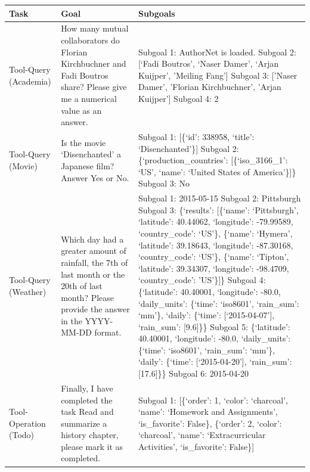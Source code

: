 \begin{table}[t!]
\centering
\footnotesize
\begin{tabular}{p{2.0cm}p{5.25cm}p{5.25cm}}
\toprule
\textbf{Task} & \textbf{Goal} & \textbf{Subgoals} \\ \midrule
Tool-Query (Academia)
&
How many mutual collaborators do Florian Kirchbuchner and Fadi Boutros share? Please give me a numerical value as an answer.
&
Subgoal 1: AuthorNet is loaded. \newline
Subgoal 2: [`Fadi Boutros', `Naser Damer', `Arjan Kuijper', 'Meiling Fang'] \newline
Subgoal 3: ['Naser Damer', 'Florian Kirchbuchner', 'Arjan Kuijper'] \newline
Subgoal 4: 2
\\
\midrule
Tool-Query (Movie)
&
Is the movie `Disenchanted' a Japanese film? Answer Yes or No.
&
Subgoal 1: [\{`id': 338958, `title': `Disenchanted'\}] \newline
Subgoal 2: \{`production\_countries': [\{`iso\_3166\_1': `US', `name': `United States of America'\}]\} \newline
Subgoal 3: No
\\
\midrule
Tool-Query (Weather)
&
Which day had a greater amount of rainfall, the 7th of last month or the 20th of last month? Please provide the answer in the YYYY-MM-DD format.
&
Subgoal 1: 2015-05-15 \newline
Subgoal 2: Pittsburgh \newline
Subgoal 3: \{`results': [\{`name': `Pittsburgh', `latitude': 40.44062, `longitude': -79.99589, `country\_code': `US'\}, \{`name': `Hymera', `latitude': 39.18643, `longitude': -87.30168, `country\_code': `US'\}, \{`name': `Tipton', `latitude': 39.34307, `longitude': -98.4709, `country\_code': 'US'\}]\} \newline
Subgoal 4: \{`latitude': 40.40001, `longitude': -80.0, `daily\_units': \{`time': `iso8601', `rain\_sum': `mm'\}, `daily': \{`time': [`2015-04-07'], `rain\_sum': [9.6]\}\} \newline
Subgoal 5: \{`latitude': 40.40001, `longitude': -80.0, `daily\_units': \{`time': `iso8601', `rain\_sum': `mm'\}, `daily': \{`time': [`2015-04-20'], `rain\_sum': [17.6]\}\} \newline
Subgoal 6: 2015-04-20
\\
\midrule
Tool-Operation (Todo)
&
Finally, I have completed the task Read and summarize a history chapter, please mark it as completed.
&
Subgoal 1: [\{`order': 1, `color': `charcoal', `name': `Homework and Assignments', `is\_favorite': False\}, \{`order': 2, `color': `charcoal', `name': `Extracurricular Activities', `is\_favorite': False\}] \newline

\end{tabular}
\end{table}
